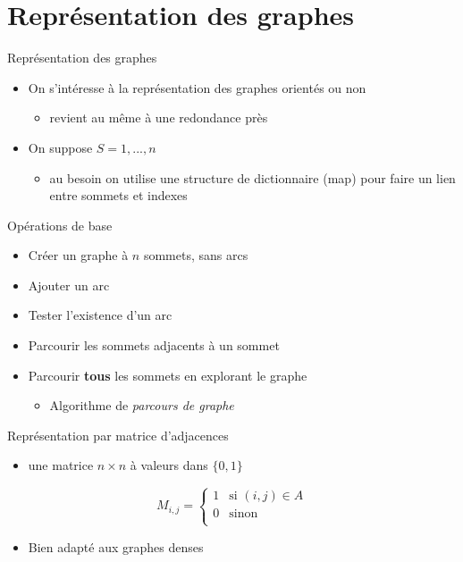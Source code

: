 
\section{Représentation des graphes}

\begin{frame}{Représentation des graphes}
    \begin{itemize}
        \item On s'intéresse à la représentation des graphes orientés ou non
        \begin{itemize}
            \item revient au même à une redondance près
        \end{itemize}
        \item On suppose $S={1,...,n}$
        \begin{itemize}
            \item au besoin on utilise une structure de dictionnaire (map) pour faire un lien entre sommets et indexes
        \end{itemize}
    \end{itemize}
\end{frame}

\begin{frame}{Opérations de base}
    \begin{itemize}
        \item Créer un graphe à $n$ sommets, sans arcs
        \item Ajouter un arc
        \item Tester l'existence d'un arc 
        \item Parcourir les sommets adjacents à un sommet 
        \item Parcourir \textbf{tous} les sommets en explorant le graphe
        \begin{itemize}
            \item Algorithme de \emph{parcours de graphe}
        \end{itemize}
    \end{itemize}
\end{frame}

\begin{frame}{Représentation par matrice d'adjacences}
    \begin{itemize}
        \item une matrice $n \times n$ à valeurs dans $\{0,1\}$
    \end{itemize}
    \begin{equation*}
        M_{i,j} = \left\{ 
            \begin{array}{ll}
                1 & \mbox{si } (i,j) \in A \\
                0 & \mbox{sinon} \\
            \end{array}
            \right.
        \end{equation*}
\begin{itemize}
    \item Bien adapté aux graphes denses 
\end{itemize}
\end{frame}

